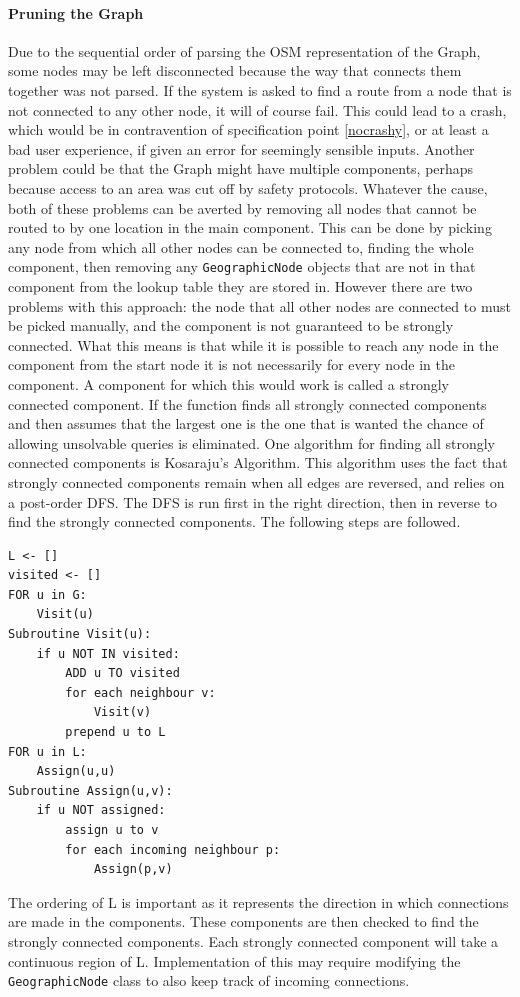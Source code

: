 \documentclass[11pt,twoside,a4paper]{report}
\begin{document}
\paragraph{Pruning the Graph}
Due to the sequential order of parsing the OSM representation of the Graph, some nodes may be left disconnected because the way that connects them together was not parsed. If the system is asked to find a route from a 
node that is not connected to any other node, it will of course fail. This could lead to a crash, which would be in contravention of specification point \ref{nocrashy}, or at least a bad user experience, if given an error for seemingly sensible inputs.
Another problem could be that the Graph might have multiple components, perhaps because access to an area was cut off by safety protocols. Whatever the cause, both of these problems can be averted by removing all nodes that cannot be routed to by one location in the 
main component. This can be done by picking any node from which all other nodes can be connected to, finding the whole component, then removing any \texttt{GeographicNode} objects that are not in that component from the lookup table they are stored in. However there are two problems with this approach:
 the node that all other nodes are connected to must be picked manually, and the component is not guaranteed to be strongly connected. What this means is that while it is possible to reach any node in the component from the start node it is not necessarily for every node in the component. 
A component for which this would work is called a strongly connected component. If the function finds all strongly connected components and then assumes that the largest one is the one that is wanted the chance of allowing unsolvable queries is eliminated. 
One algorithm for finding all strongly connected components is Kosaraju's Algorithm\cite{wikipedia_2022}. This algorithm uses the fact that strongly connected components remain when all edges are reversed, and relies on a post-order DFS. The DFS is run first in the right direction, then in reverse to find the strongly connected components.
The following steps are followed.
\begin{lstlisting}
L <- []
visited <- []
FOR u in G:
    Visit(u)
Subroutine Visit(u):
    if u NOT IN visited:
        ADD u TO visited
        for each neighbour v:
            Visit(v)
        prepend u to L
FOR u in L:
    Assign(u,u)
Subroutine Assign(u,v):
    if u NOT assigned:
        assign u to v
        for each incoming neighbour p:
            Assign(p,v)
\end{lstlisting}
The ordering of L is important as it represents the direction in which connections are made in the components. These components are then checked to find the strongly connected components. Each strongly connected component will take a continuous region of L. 
Implementation of this may require modifying the \texttt{GeographicNode} class to also keep track of incoming connections.  
\end{document}
